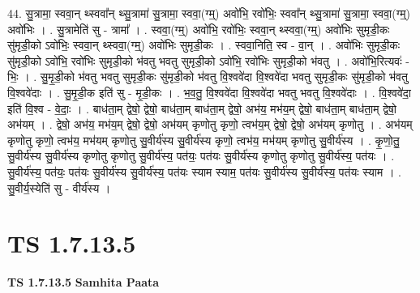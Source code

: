 \documentclass[17pt]{extarticle}
\begin{document}
44. सु॒त्रामा॒ स्ववा॒न् थ्स्ववा᳚न् थ्सु॒त्रामा॑ सु॒त्रामा॒ स्ववा॒(ग्म्॒) अवो॑भि॒ रवो॑भिः॒ स्ववा᳚न् थ्सु॒त्रामा॑ सु॒त्रामा॒ स्ववा॒(ग्म्॒) अवो॑भिः । . सु॒त्रामेति॑ सु - त्रामा᳚ । . स्ववा॒(ग्म्॒) अवो॑भि॒ रवो॑भिः॒ स्ववा॒न् थ्स्ववा॒(ग्म्॒) अवो॑भिः सुमृडी॒कः सु॑मृडी॒को ऽवो॑भिः॒ स्ववा॒न् थ्स्ववा॒(ग्म्॒) अवो॑भिः सुमृडी॒कः । . स्ववा॒निति॒ स्व - वा॒न् । . अवो॑भिः सुमृडी॒कः सु॑मृडी॒को ऽवो॑भि॒ रवो॑भिः सुमृडी॒को भ॑वतु भवतु सुमृडी॒को ऽवो॑भि॒ रवो॑भिः सुमृडी॒को भ॑वतु । . अवो॑भि॒रित्यवः॑ - भिः॒ । . सु॒मृ॒डी॒को भ॑वतु भवतु सुमृडी॒कः सु॑मृडी॒को भ॑वतु वि॒श्ववे॑दा वि॒श्ववे॑दा भवतु सुमृडी॒कः सु॑मृडी॒को भ॑वतु वि॒श्ववे॑दाः । . सु॒मृ॒डी॒क इति॑ सु - मृ॒डी॒कः । . भ॒व॒तु॒ वि॒श्ववे॑दा वि॒श्ववे॑दा भवतु भवतु वि॒श्ववे॑दाः । . वि॒श्ववे॑दा॒ इति॑ वि॒श्व - वे॒दाः॒ । . बाध॑ता॒म् द्वेषो॒ द्वेषो॒ बाध॑ता॒म् बाध॑ता॒म् द्वेषो॒ अभ॑य॒ मभ॑य॒म् द्वेषो॒ बाध॑ता॒म् बाध॑ता॒म् द्वेषो॒ अभ॑यम् । . द्वेषो॒ अभ॑य॒ मभ॑य॒म् द्वेषो॒ द्वेषो॒ अभ॑यम् कृणोतु कृणो॒ त्वभ॑य॒म् द्वेषो॒ द्वेषो॒ अभ॑यम् कृणोतु । . अभ॑यम् कृणोतु कृणो॒ त्वभ॑य॒ मभ॑यम् कृणोतु सु॒वीर्य॑स्य सु॒वीर्य॑स्य कृणो॒ त्वभ॑य॒ मभ॑यम् कृणोतु सु॒वीर्य॑स्य । . कृ॒णो॒तु॒ सु॒वीर्य॑स्य सु॒वीर्य॑स्य कृणोतु कृणोतु सु॒वीर्य॑स्य॒ पत॑यः॒ पत॑यः सु॒वीर्य॑स्य कृणोतु कृणोतु सु॒वीर्य॑स्य॒ पत॑यः । . सु॒वीर्य॑स्य॒ पत॑यः॒ पत॑यः सु॒वीर्य॑स्य सु॒वीर्य॑स्य॒ पत॑यः स्याम स्याम॒ पत॑यः सु॒वीर्य॑स्य सु॒वीर्य॑स्य॒ पत॑यः स्याम । . सु॒वीर्य॒स्येति॑ सु - वीर्य॑स्य । \newline
\pagebreak
{}
\section*{ TS 1.7.13.5 }

\textbf{TS 1.7.13.5 } \newline
\textbf{Samhita Paata} \newline
\end{document}
